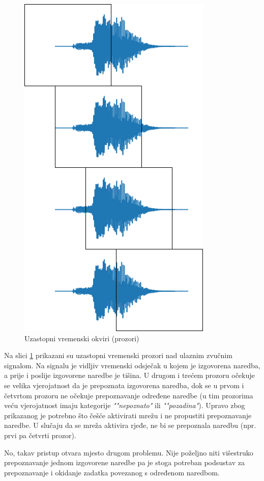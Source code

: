 \begin{figure}[htb]
    \centering
    \includegraphics[width=0.4\linewidth]{Chapters/struktura_sustava/aktivacija_nn/timeline.png}
    \caption{Uzastopni vremenski okviri (prozori) \cite{flowchart}}
    \label{pic:timeline}
\end{figure}

Na slici \ref{pic:timeline} prikazani su uzastopni vremenski prozori nad ulaznim zvučnim signalom.
Na signalu je vidljiv vremenski odsječak u kojem je izgovorena naredba, a prije i poslije
izgovorene naredbe je tišina. U drugom i trećem prozoru očekuje se velika vjerojatnost da 
je prepoznata izgovorena naredba, dok se u prvom i četvrtom prozoru ne očekuje prepoznavanje
određene naredbe (u tim prozorima veću vjerojatnost imaju kategorije \textit{""nepoznato"} ili \textit{""pozadina"}).
Upravo zbog prikazanog je potrebno što češće aktivirati mrežu i ne propustiti prepoznavanje naredbe. 
U slučaju da se mreža aktivira rjeđe, ne bi se prepoznala naredbu (npr. prvi pa četvrti
prozor). 

No, takav pristup otvara mjesto drugom problemu. Nije poželjno niti višestruko prepoznavanje
jednom izgovorene naredbe pa je stoga potreban podsustav za prepoznavanje i okidanje zadatka
povezanog s određenom naredbom.